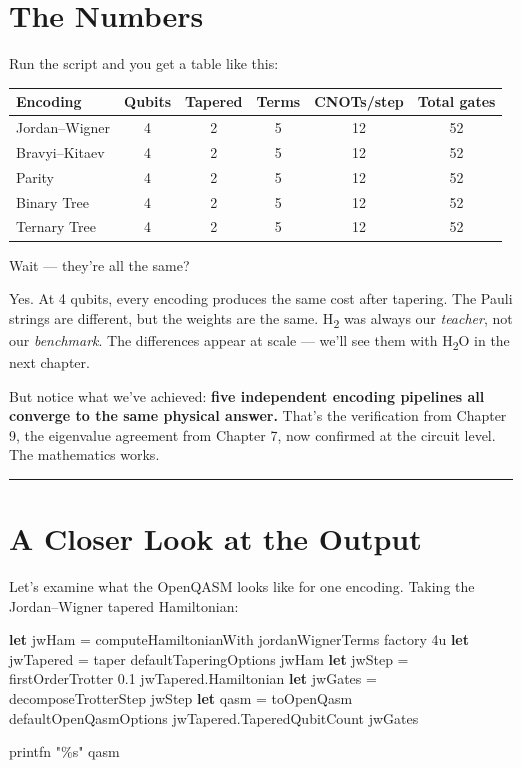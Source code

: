 \documentclass[
  11pt,
  oneside]{book}
\newenvironment{Shaded}{\begin{snugshade}}{\end{snugshade}}
\newcommand{\DecValTok}[1]{\textcolor[rgb]{0.00,0.00,0.81}{#1}}
\newcommand{\FloatTok}[1]{\textcolor[rgb]{0.00,0.00,0.81}{#1}}
\newcommand{\KeywordTok}[1]{\textcolor[rgb]{0.13,0.29,0.53}{\textbf{#1}}}
\newcommand{\NormalTok}[1]{#1}
\newcommand{\StringTok}[1]{\textcolor[rgb]{0.31,0.60,0.02}{#1}}
\begin{document}
\section{The Numbers}\label{the-numbers}

Run the script and you get a table like this:

\begin{longtable}[]{@{}lccccc@{}}
\toprule\noalign{}
Encoding & Qubits & Tapered & Terms & CNOTs/step & Total gates \\
\midrule\noalign{}
\endhead
\bottomrule\noalign{}
\endlastfoot
Jordan--Wigner & 4 & 2 & 5 & 12 & 52 \\
Bravyi--Kitaev & 4 & 2 & 5 & 12 & 52 \\
Parity & 4 & 2 & 5 & 12 & 52 \\
Binary Tree & 4 & 2 & 5 & 12 & 52 \\
Ternary Tree & 4 & 2 & 5 & 12 & 52 \\
\end{longtable}

Wait --- they're all the same?

Yes. At 4 qubits, every encoding produces the same cost after tapering.
The Pauli strings are different, but the weights are the same. H\textsubscript{2} was
always our \emph{teacher}, not our \emph{benchmark}. The differences
appear at scale --- we'll see them with H\textsubscript{2}O in the next chapter.

But notice what we've achieved: \textbf{five independent encoding
pipelines all converge to the same physical answer.} That's the
verification from Chapter 9, the eigenvalue agreement from Chapter 7,
now confirmed at the circuit level. The mathematics works.

\begin{center}\rule{0.5\linewidth}{0.5pt}\end{center}

\section{A Closer Look at the Output}\label{a-closer-look-at-the-output}

Let's examine what the OpenQASM looks like for one encoding. Taking the
Jordan--Wigner tapered Hamiltonian:

\begin{Shaded}
\begin{Highlighting}[]
\KeywordTok{let}\NormalTok{ jwHam = computeHamiltonianWith jordanWignerTerms factory }\DecValTok{4}\NormalTok{u}
\KeywordTok{let}\NormalTok{ jwTapered = taper defaultTaperingOptions jwHam}
\KeywordTok{let}\NormalTok{ jwStep = firstOrderTrotter }\FloatTok{0.1}\NormalTok{ jwTapered.Hamiltonian}
\KeywordTok{let}\NormalTok{ jwGates = decomposeTrotterStep jwStep}
\KeywordTok{let}\NormalTok{ qasm = toOpenQasm defaultOpenQasmOptions jwTapered.TaperedQubitCount jwGates}

\NormalTok{printfn }\StringTok{"\%s"}\NormalTok{ qasm}
\end{Highlighting}
\end{Shaded}
\end{document}
